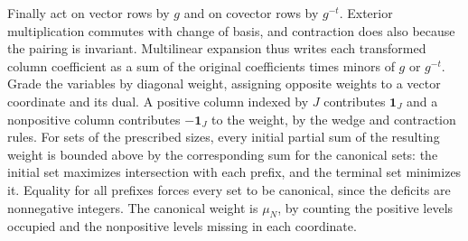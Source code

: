 \documentclass[11pt]{amsart}
\theoremstyle{definition}
\theoremstyle{remark}
\begin{document}
Finally act on vector rows by $g$ and on covector rows by $g^{-t}$.
Exterior multiplication commutes with change of basis, and
contraction does also because the pairing is invariant. Multilinear
expansion thus writes each transformed column coefficient as a sum
of the original coefficients times minors of $g$ or $g^{-t}$.
Grade the variables by diagonal weight, assigning opposite weights
to a vector coordinate and its dual. A positive column indexed by
$J$ contributes $\mathbf1_J$ and a nonpositive column contributes
$-\mathbf1_J$ to the weight, by the wedge and contraction rules.
For sets of the prescribed sizes, every initial partial sum of
the resulting weight is bounded above by the corresponding sum
for the canonical sets: the initial set maximizes intersection
with each prefix, and the terminal set minimizes it. Equality
for all prefixes forces every set to be canonical, since the
deficits are nonnegative integers. The canonical weight is
$\mu_N$, by counting the positive levels occupied and the
nonpositive levels missing in each coordinate.
\end{document}
